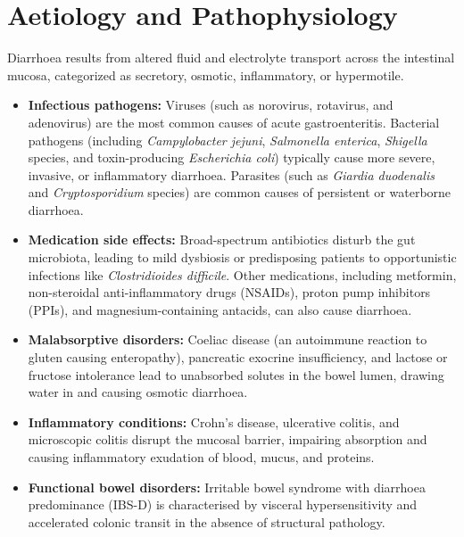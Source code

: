 \section*{Aetiology and Pathophysiology}
Diarrhoea results from altered fluid and electrolyte transport across the intestinal mucosa, categorized as secretory, osmotic, inflammatory, or hypermotile.
\begin{itemize}
    \item \textbf{Infectious pathogens:} Viruses (such as norovirus, rotavirus, and adenovirus) are the most common causes of acute gastroenteritis. Bacterial pathogens (including \textit{Campylobacter jejuni}, \textit{Salmonella enterica}, \textit{Shigella} species, and toxin-producing \textit{Escherichia coli}) typically cause more severe, invasive, or inflammatory diarrhoea. Parasites (such as \textit{Giardia duodenalis} and \textit{Cryptosporidium} species) are common causes of persistent or waterborne diarrhoea.
    \item \textbf{Medication side effects:} Broad-spectrum antibiotics disturb the gut microbiota, leading to mild dysbiosis or predisposing patients to opportunistic infections like \textit{Clostridioides difficile}. Other medications, including metformin, non-steroidal anti-inflammatory drugs (NSAIDs), proton pump inhibitors (PPIs), and magnesium-containing antacids, can also cause diarrhoea.
    \item \textbf{Malabsorptive disorders:} Coeliac disease (an autoimmune reaction to gluten causing enteropathy), pancreatic exocrine insufficiency, and lactose or fructose intolerance lead to unabsorbed solutes in the bowel lumen, drawing water in and causing osmotic diarrhoea.
    \item \textbf{Inflammatory conditions:} Crohn's disease, ulcerative colitis, and microscopic colitis disrupt the mucosal barrier, impairing absorption and causing inflammatory exudation of blood, mucus, and proteins.
    \item \textbf{Functional bowel disorders:} Irritable bowel syndrome with diarrhoea predominance (IBS-D) is characterised by visceral hypersensitivity and accelerated colonic transit in the absence of structural pathology.
\end{itemize}

